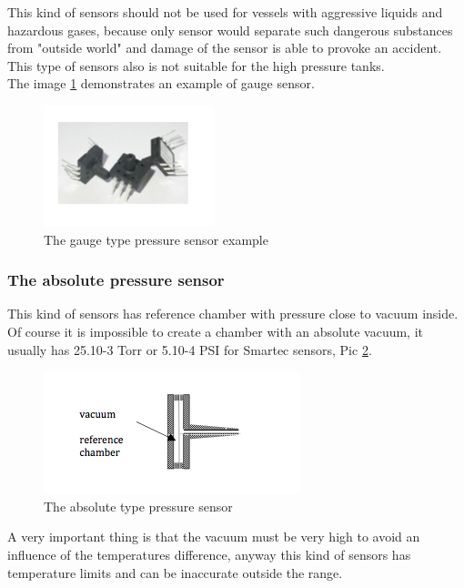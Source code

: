 \documentclass[english]{article}
\begin{document}
This kind of sensors should not be used for vessels with aggressive liquids and hazardous gases, because only sensor would separate such dangerous substances from  "outside world" and damage of the sensor is able to provoke an accident. This type of sensors also is not suitable for the high pressure tanks.\cite{spd} \\

The image \ref{fig:gaugePhoto} demonstrates an example of gauge sensor.

\begin{figure}[H]
\centerline{\includegraphics[scale=0.7]{PressureSensors/gaugePhoto}}
\caption{The gauge type pressure sensor example \label{fig:gaugePhoto}}
\end{figure}

\subsubsection{The absolute pressure sensor}

This kind of sensors has reference chamber with pressure close to vacuum inside. Of course it is impossible to create a chamber with an absolute vacuum, it usually has 25.10-3 Torr or 5.10-4 PSI for Smartec sensors, Pic \ref{fig:abs}.\\

\begin{figure}[H]
\centerline{\includegraphics[scale=1]{PressureSensors/abs}}
\caption{The absolute type pressure sensor \label{fig:abs}}
\end{figure}

A very important thing is that the vacuum must be very high to avoid an influence of the temperatures difference, anyway this kind of sensors has temperature limits and can be inaccurate outside the range.\\
\end{document}
